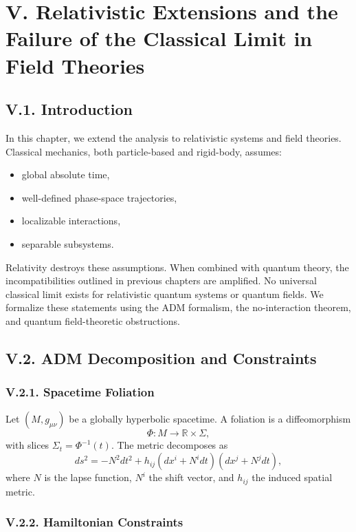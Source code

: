 \documentclass[12pt,oneside]{book}
\theoremstyle{plain}
\theoremstyle{definition}
\begin{document}
\chapter{V. Relativistic Extensions and the Failure of the Classical Limit in Field Theories}

\section{V.1. Introduction}

In this chapter, we extend the analysis to relativistic systems and field theories. Classical mechanics, both particle-based and rigid-body, assumes:

\begin{itemize}
    \item global absolute time,
    \item well-defined phase-space trajectories,
    \item localizable interactions,
    \item separable subsystems.
\end{itemize}

Relativity destroys these assumptions. When combined with quantum theory, the incompatibilities outlined in previous chapters are amplified. No universal classical limit exists for relativistic quantum systems or quantum fields. We formalize these statements using the ADM formalism, the no-interaction theorem, and quantum field-theoretic obstructions.

\section{V.2. ADM Decomposition and Constraints}

\subsection*{V.2.1. Spacetime Foliation}

Let $(M,g_{\mu\nu})$ be a globally hyperbolic spacetime. A foliation is a diffeomorphism
\[
\Phi: M \to \mathbb{R} \times \Sigma,
\]
with slices $\Sigma_t = \Phi^{-1}(t)$. The metric decomposes as
\[
ds^2 = -N^2 dt^2 + h_{ij}(dx^i + N^i dt)(dx^j + N^j dt),
\]
where $N$ is the lapse function, $N^i$ the shift vector, and $h_{ij}$ the induced spatial metric.

\subsection*{V.2.2. Hamiltonian Constraints}
\end{document}
